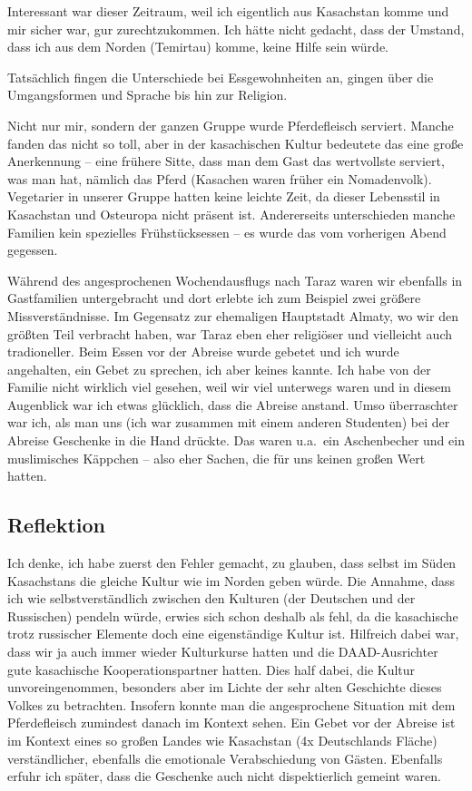 \documentclass{../../sem_paper}
\begin{document}
Interessant war dieser Zeitraum, weil ich eigentlich aus Kasachstan komme und mir sicher war, gur zurechtzukommen. 
Ich hätte nicht gedacht, dass der Umstand, dass ich aus dem Norden (Temirtau) komme, keine Hilfe sein würde.

Tatsächlich fingen die Unterschiede bei Essgewohnheiten an, gingen über die Umgangsformen und Sprache bis hin zur Religion. 

Nicht nur mir, sondern der ganzen Gruppe wurde Pferdefleisch serviert. 
Manche fanden das nicht so toll, aber in der kasachischen Kultur bedeutete das eine große Anerkennung – eine frühere Sitte, dass man dem Gast das wertvollste serviert, was man hat, nämlich das Pferd (Kasachen waren früher ein Nomadenvolk). 
Vegetarier in unserer Gruppe hatten keine leichte Zeit, da dieser Lebensstil in Kasachstan und Osteuropa nicht präsent ist. 
Andererseits unterschieden manche Familien kein spezielles Frühstücksessen -- es wurde das vom vorherigen Abend gegessen. 

Während des angesprochenen Wochendausflugs nach Taraz waren wir ebenfalls in Gastfamilien untergebracht und dort erlebte ich zum Beispiel zwei größere Missverständnisse. 
Im Gegensatz zur ehemaligen Hauptstadt Almaty, wo wir den größten Teil verbracht haben, war Taraz eben eher religiöser und vielleicht auch tradioneller. 
Beim Essen vor der Abreise wurde gebetet und ich wurde angehalten, ein Gebet zu sprechen, ich aber keines kannte. 
Ich habe von der Familie nicht wirklich viel gesehen, weil wir viel unterwegs waren und in diesem Augenblick war ich etwas glücklich, dass die Abreise anstand. 
Umso überraschter war ich, als man uns (ich war zusammen mit einem anderen Studenten) bei der Abreise Geschenke in die Hand drückte. 
Das waren u.a.\ ein Aschenbecher und ein muslimisches Käppchen – also eher Sachen, die für uns keinen großen Wert hatten.

\subsection*{Reflektion}

Ich denke, ich habe zuerst den Fehler gemacht, zu glauben, dass selbst im Süden Kasachstans die gleiche Kultur wie im Norden geben würde. 
Die Annahme, dass ich wie selbstverständlich zwischen den Kulturen (der Deutschen und der Russischen) pendeln würde, erwies sich schon deshalb als fehl, da die kasachische trotz russischer Elemente doch eine eigenständige Kultur ist. 
Hilfreich dabei war, dass wir ja auch immer wieder Kulturkurse hatten und die DAAD-Ausrichter gute kasachische Kooperationspartner hatten. Dies half dabei, die Kultur unvoreingenommen, besonders aber im Lichte der sehr alten Geschichte dieses Volkes zu betrachten. Insofern konnte man die angesprochene Situation mit dem Pferdefleisch zumindest danach im Kontext sehen. 
Ein Gebet vor der Abreise ist im Kontext eines so großen Landes wie Kasachstan (4x Deutschlands Fläche) verständlicher, ebenfalls die emotionale Verabschiedung von Gästen. 
Ebenfalls erfuhr ich später, dass die Geschenke auch nicht dispektierlich gemeint waren.
\end{document}

